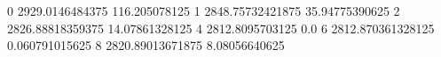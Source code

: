 0 2929.0146484375 116.205078125
1 2848.75732421875 35.94775390625
2 2826.88818359375 14.07861328125
4 2812.8095703125 0.0
6 2812.870361328125 0.060791015625
8 2820.89013671875 8.08056640625
